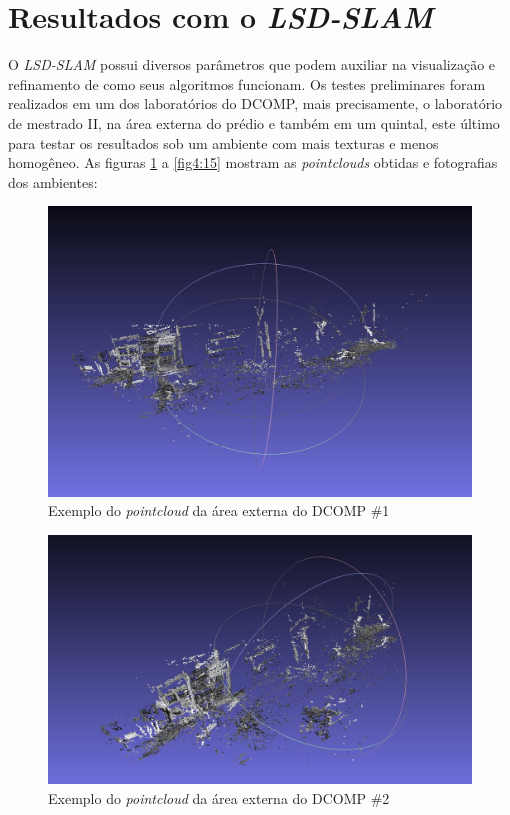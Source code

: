 \section{Resultados com o \textit{LSD-SLAM}}

O \textit{LSD-SLAM} possui diversos parâmetros que podem auxiliar na visualização e refinamento de como seus algoritmos funcionam. Os testes preliminares foram realizados em um dos laboratórios do DCOMP, mais precisamente, o laboratório de mestrado II, na área externa do prédio e também em um quintal, este último para testar os resultados sob um ambiente com mais texturas e menos homogêneo. As figuras \ref{fig4:5} a \ref{fig4:15} mostram as \textit{pointclouds} obtidas e fotografias dos ambientes:

\begin{figure}[!htb]
	\centering
		\includegraphics[width= \textwidth]{Imagens/figura4-5.jpg}
	\caption{Exemplo do \textit{pointcloud} da área externa do DCOMP \#1}
	\label{fig4:5}
\end{figure}

\begin{figure}[!htb]
	\centering
		\includegraphics[width= \textwidth]{Imagens/figura4-6.jpg}
	\caption{Exemplo do \textit{pointcloud} da área externa do DCOMP \#2}
	\label{fig4:6}
\end{figure}

